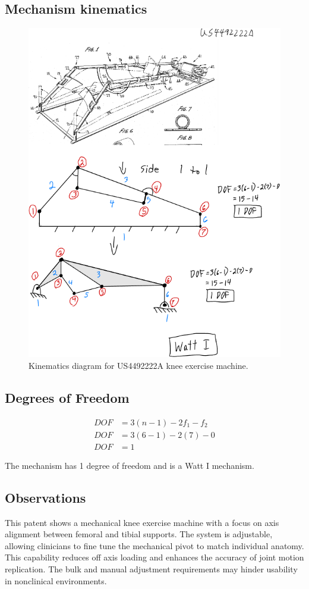 \documentclass[11pt]{article}
\begin{document}
\subsection{Mechanism kinematics}
\begin{figure}[H]
  \centering
  \includegraphics[width=0.54\linewidth]{../Kinematic Mechanism Images/4492222.png}
  \caption{Kinematics diagram for US4492222A knee exercise machine.}
  \label{fig:US4492222A_kinematics}
\end{figure}

\subsection{Degrees of Freedom}
\[
\begin{aligned}
DOF &= 3(n-1) - 2f_1 - f_2 \\
DOF &= 3(6-1) - 2(7) - 0 \\
DOF &= 1
\end{aligned}
\]

The mechanism has 1 degree of freedom and is a Watt I mechanism.

\subsection{Observations}
This patent shows a mechanical knee exercise machine with a focus on axis alignment between femoral and tibial supports. The system is adjustable, allowing clinicians to fine tune the mechanical pivot to match individual anatomy. This capability reduces off axis loading and enhances the accuracy of joint motion replication. The bulk and manual adjustment requirements may hinder usability in nonclinical environments.
\end{document}
